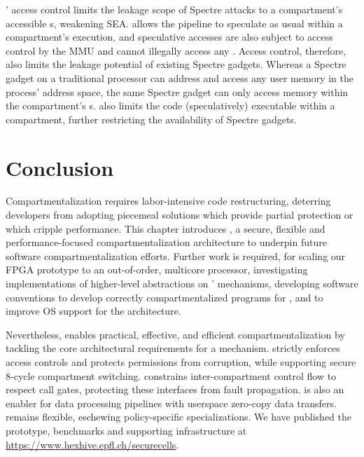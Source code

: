 \seccells' access control limits the leakage scope of 
Spectre attacks to a compartment's accessible \cell{}s, 
weakening SEA.
\seccells allows the pipeline to speculate as usual within a compartment's 
execution, and speculative accesses are also subject to access control 
by the MMU and cannot illegally access any \cell.
Access control, therefore, also limits the leakage potential of existing
Spectre gadgets.
Whereas a Spectre gadget on a traditional processor can address and
access any user memory in the process' address space, the same Spectre
gadget can only access memory within the compartment's \cell{}s.
\seccells also limits the code (speculatively) executable within a compartment,
further restricting the availability of Spectre gadgets.


\section{Conclusion}
\label{sec:seccells:conclusion}

Compartmentalization requires labor-intensive code restructuring, 
deterring developers from adopting piecemeal solutions which provide
partial protection or which cripple performance.
This chapter introduces \seccells, a secure, flexible and 
performance-focused compartmentalization architecture to
underpin future software compartmentalization efforts.
Further work is required, for 
scaling our FPGA prototype to an out-of-order, multicore processor, 
investigating implementations of higher-level abstractions 
on \seccells' mechanisms,
developing software conventions to develop correctly
compartmentalized programs for \seccells, 
and to improve OS support for the architecture.

Nevertheless, \seccells enables practical, effective, and efficient
compartmentalization by tackling 
the core architectural requirements for a mechanism.
\seccells strictly enforces access controls and protects permissions
from corruption, while supporting secure 8-cycle compartment switching.
\seccells constrains inter-compartment control flow to respect
call gates, protecting these interfaces from fault propagation.
\seccells is also an enabler for data processing pipelines
with userspace zero-copy data transfers.
\seccells remains flexible, eschewing policy-specific specializations.
We have published the \seccells prototype, benchmarks
and supporting infrastructure
at \url{https://www.hexhive.epfl.ch/securecells}.
